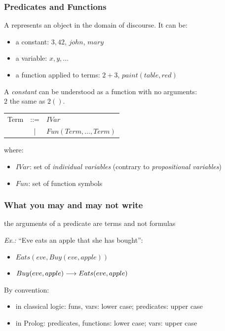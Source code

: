 \documentclass{beamer}
\begin{document}
\begin{frame}[fragile]\frametitle{Predicates and Functions}

  A  represents an object in the domain of discourse. It can be:
  \begin{itemize}
  \item a constant: $3, 42$, $john$, $mary$
  \item a variable: $x, y, \dots$
  \item a function applied to terms: $2 + 3$, $paint(table, red)$
  \end{itemize}

  \vspace{3mm}
  A \emph{constant} can be understood as a function with no arguments:\\ $2$ the same as $2()$.

  \vspace{3mm}

  \begin{tabular}{rcl}
    Term  & ::=  & $IVar$ \\
          & | &  $Fun(Term, \dots, Term)$
  \end{tabular}
  
  where:
  \begin{itemize}
  \item $IVar$: set of \emph{individual variables} (contrary to
    \emph{propositional variables})
  \item $Fun$: set of function symbols
  \end{itemize}

\end{frame}

\begin{frame}[fragile]\frametitle{What you may and may not write}

   the arguments of a predicate are terms and not formulas

  \emph{Ex.:} ``Eve eats an apple that she has bought'':
  \begin{itemize}
  \item {} $Eats(eve, Buy(eve, apple))$
  \item {} $Buy(eve, apple) \longrightarrow Eats(eve, apple)$
  \end{itemize}

  \vspace{3mm}
  By convention:
  \begin{itemize}
  \item in classical logic: funs, vars: lower case; predicates: upper case
  \item in Prolog: predicates, functions: lower case; vars: upper case
  \end{itemize}

\end{frame}
\end{document}
